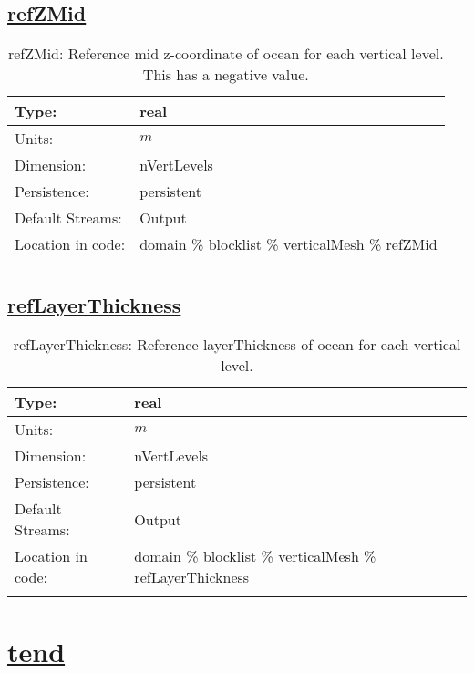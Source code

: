 \subsection[refZMid]{\hyperref[sec:var_tab_verticalMesh]{refZMid}}
\label{subsec:var_sec_verticalMesh_refZMid}
\begin{center}
\begin{longtable}{| p{2.0in} | p{4.0in} |}
        \hline 
        Type: & real \\
        \hline 
        Units: & $m$ \\
        \hline 
        Dimension: & nVertLevels \\
        \hline 
        Persistence: & persistent \\
        \hline 
		 Default Streams: & Output  \\
        \hline 
		 Location in code: & domain \% blocklist \% verticalMesh \% refZMid \\
		 \hline 
    \caption{refZMid: Reference mid z-coordinate of ocean for each vertical level.  This has a negative value.}
\end{longtable}
\end{center}
\subsection[refLayerThickness]{\hyperref[sec:var_tab_verticalMesh]{refLayerThickness}}
\label{subsec:var_sec_verticalMesh_refLayerThickness}
\begin{center}
\begin{longtable}{| p{2.0in} | p{4.0in} |}
        \hline 
        Type: & real \\
        \hline 
        Units: & $m$ \\
        \hline 
        Dimension: & nVertLevels \\
        \hline 
        Persistence: & persistent \\
        \hline 
		 Default Streams: & Output  \\
        \hline 
		 Location in code: & domain \% blocklist \% verticalMesh \% refLayerThickness \\
		 \hline 
    \caption{refLayerThickness: Reference layerThickness of ocean for each vertical level.}
\end{longtable}
\end{center}
\section[tend]{\hyperref[sec:var_tab_tend]{tend}}
\label{sec:var_sec_tend}
